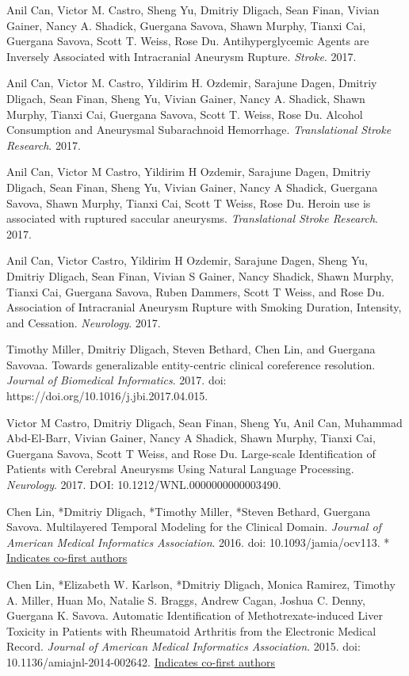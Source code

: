 \documentclass[letterpaper]{article}
\renewenvironment{itemize}{
  \begin{list}{}{
    \setlength{\leftmargin}{1.5em}
  }
}{
  \end{list}
}
\begin{document}
\begin{itemize}
\item Anil Can, Victor M. Castro, Sheng Yu, Dmitriy Dligach, Sean Finan, Vivian Gainer, Nancy A. Shadick, Guergana Savova, Shawn Murphy, Tianxi Cai, Guergana Savova, Scott T. Weiss, Rose Du. Antihyperglycemic Agents are Inversely Associated with Intracranial Aneurysm Rupture. \emph{Stroke}. 2017.
\item Anil Can, Victor M. Castro, Yildirim H. Ozdemir, Sarajune Dagen, Dmitriy Dligach, Sean Finan, Sheng Yu, Vivian Gainer, Nancy A. Shadick, Shawn Murphy, Tianxi Cai, Guergana Savova, Scott T. Weiss, Rose Du. Alcohol Consumption and Aneurysmal Subarachnoid Hemorrhage. \emph{Translational Stroke Research}. 2017.
\item Anil Can, Victor M Castro, Yildirim H Ozdemir, Sarajune Dagen, Dmitriy Dligach, Sean Finan, Sheng Yu, Vivian Gainer, Nancy A Shadick, Guergana Savova, Shawn Murphy, Tianxi Cai, Scott T Weiss, Rose Du. Heroin use is associated with ruptured saccular aneurysms. \emph{Translational Stroke Research}. 2017.
\item Anil Can, Victor Castro, Yildirim H Ozdemir, Sarajune Dagen, Sheng Yu, Dmitriy Dligach, Sean Finan, Vivian S Gainer, Nancy Shadick, Shawn Murphy, Tianxi Cai, Guergana Savova, Ruben Dammers, Scott T Weiss, and Rose Du. Association of Intracranial Aneurysm Rupture with Smoking Duration, Intensity, and Cessation. \emph{Neurology}. 2017.
\item Timothy Miller, Dmitriy Dligach, Steven Bethard, Chen Lin, and Guergana Savovaa. Towards generalizable entity-centric clinical coreference resolution. \emph{Journal of Biomedical Informatics}. 2017. doi: https://doi.org/10.1016/j.jbi.2017.04.015.
\item Victor M Castro, Dmitriy Dligach, Sean Finan, Sheng Yu, Anil Can, Muhammad Abd-El-Barr, Vivian Gainer, Nancy A Shadick, Shawn Murphy, Tianxi Cai, Guergana Savova, Scott T Weiss, and Rose Du. Large-scale Identification of Patients with Cerebral Aneurysms Using Natural Language Processing. \emph{Neurology}. 2017. DOI: 10.1212/WNL.0000000000003490.
\item *Chen Lin, *Dmitriy Dligach, *Timothy Miller, *Steven Bethard, Guergana Savova. Multilayered Temporal Modeling for the Clinical Domain. \emph{Journal of American Medical Informatics Association}. 2016. doi: 10.1093/jamia/ocv113. * \underline{Indicates co-first authors}
\item *Chen Lin, *Elizabeth W. Karlson, *Dmitriy Dligach, Monica Ramirez, Timothy A. Miller, Huan Mo, Natalie S. Braggs, Andrew Cagan, Joshua C. Denny, Guergana K. Savova. Automatic Identification of Methotrexate-induced Liver Toxicity in Patients with Rheumatoid Arthritis from the Electronic Medical Record. \emph{Journal of American Medical Informatics Association}. 2015. doi: 10.1136/amiajnl-2014-002642. \newline * \underline{Indicates co-first authors}

\end{itemize}
\end{document}
